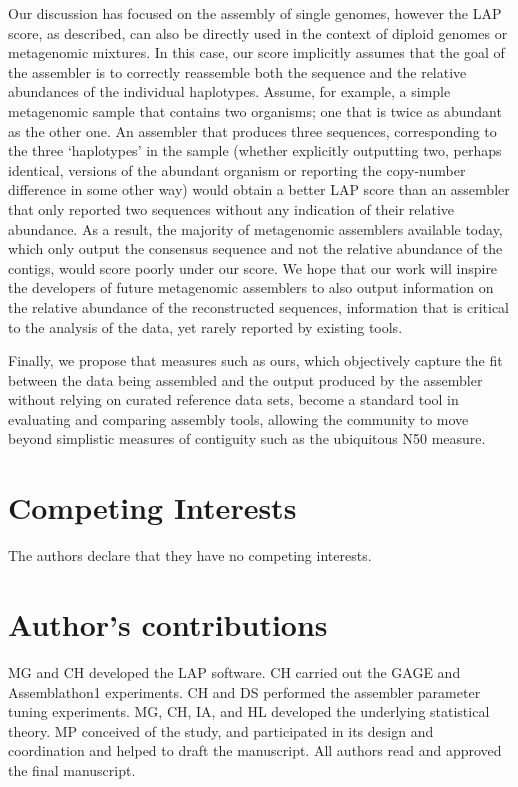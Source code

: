 Our discussion has focused on the assembly of single genomes, however
the LAP score, as described, can also be directly used in the context
of diploid genomes or metagenomic mixtures.  In this case, our
score implicitly assumes that the goal of the assembler is to
correctly reassemble both the sequence and the relative abundances of the
individual haplotypes.  Assume, for example, a simple metagenomic
sample that contains two organisms; one that is twice as abundant as
the other one.  An assembler that produces three sequences,
corresponding to the three `haplotypes' in the sample (whether
explicitly outputting two, perhaps identical, versions of the abundant
organism or reporting the copy-number difference in some other way)
would obtain a better LAP score than an assembler that only reported
two sequences without any indication of their relative abundance. As
a result, the majority of metagenomic assemblers available today,
which only output the consensus sequence and not the relative
abundance of the contigs, would score poorly under our score.  We hope
that our work will inspire the developers of future metagenomic
assemblers to also output information on the relative abundance of the
reconstructed sequences, information that is critical to the analysis
of the data, yet rarely reported by existing tools.

Finally, we propose that measures such as ours, which objectively
capture the fit between the data being assembled and the output
produced by the assembler without relying on curated reference data
sets, become a standard tool in evaluating and comparing assembly
tools, allowing the community to move beyond simplistic measures of
contiguity such as the ubiquitous N50 measure.


\bigskip

\section{Competing Interests}
The authors declare that they have no competing interests.

\section{Author's contributions}
MG and CH developed the LAP software. CH carried out the GAGE and Assemblathon1 experiments. CH and DS performed the assembler parameter tuning experiments. MG, CH, IA, and HL  developed the underlying statistical theory. MP conceived of the study, and participated in its design and coordination and helped to draft the manuscript. All authors read and approved the final manuscript.


